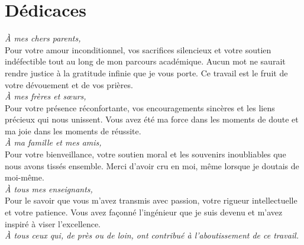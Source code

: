 \chapter*{Dédicaces}

\vspace{2cm}

\begin{center}
\textit{À mes chers parents,}\\
Pour votre amour inconditionnel, vos sacrifices silencieux et votre soutien indéfectible tout au long de mon parcours académique. Aucun mot ne saurait rendre justice à la gratitude infinie que je vous porte. Ce travail est le fruit de votre dévouement et de vos prières.\\[1cm]

\textit{À mes frères et sœurs,}\\
Pour votre présence réconfortante, vos encouragements sincères et les liens précieux qui nous unissent. Vous avez été ma force dans les moments de doute et ma joie dans les moments de réussite.\\[1cm]

\textit{À ma famille et mes amis,}\\
Pour votre bienveillance, votre soutien moral et les souvenirs inoubliables que nous avons tissés ensemble. Merci d'avoir cru en moi, même lorsque je doutais de moi-même.\\[1cm]

\textit{À tous mes enseignants,}\\
Pour le savoir que vous m'avez transmis avec passion, votre rigueur intellectuelle et votre patience. Vous avez façonné l'ingénieur que je suis devenu et m'avez inspiré à viser l'excellence.\\[1cm]

\textit{À tous ceux qui, de près ou de loin, ont contribué à l'aboutissement de ce travail.}
\end{center}